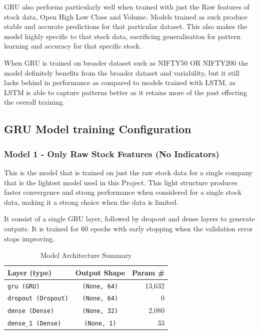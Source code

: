 GRU also performs particularly well when trained with just the Raw features of stock data, Open High Low Close and Volume. Models trained as such produce stable and accurate predictions for that particular dataset. This also makes the model highly specific to that stock data, sacrificing generalisation for pattern learning and accuracy for that specific stock.

When GRU is trained on broader dataset such as NIFTY50 OR NIFTY200 the model definitely benefits from the broader dataset and variability, but it still lacks behind in performance as compared to models trained with LSTM, as LSTM is able to capture patterns better as it retains more of the past effecting the overall training.

\subsection{GRU Model training Configuration}

\subsubsection{Model 1 - Only Raw Stock Features (No Indicators)}

This is the model that is trained on just the raw stock data for a single company that is the lightest model used in this Project. This light structure produces faster convergence and strong performance when considered for a single stock data, making it a strong choice when the data is limited.

It consist of a single GRU layer, followed by dropout and dense layers to generate outputs. It is trained for 60 epochs with early stopping when the validation error stops improving.

\begin{table}[h]
    \centering
    \begin{tabular}{|l|c|r|}
        \hline
        \textbf{Layer (type)} & \textbf{Output Shape} & \textbf{Param \#} \\
        \hline
        \hline
        \texttt{gru (GRU)} & \texttt{(None, 64)} & 13,632 \\
        \hline
        \texttt{dropout (Dropout)} & \texttt{(None, 64)} & 0 \\
        \hline
        \texttt{dense (Dense)} & \texttt{(None, 32)} & 2,080 \\
        \hline
        \texttt{dense\_1 (Dense)} & \texttt{(None, 1)} & 33 \\
        \hline
    \end{tabular}
    \caption{Model Architecture Summary}
    \label{tab:model_summary_3}
\end{table}


